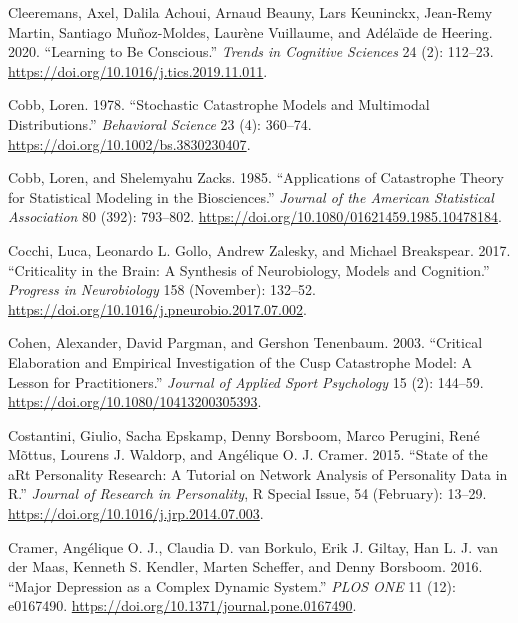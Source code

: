 \documentclass[
  a4paper,
  DIV=11,
  numbers=noendperiod,
  oneside]{scrreprt}
\newlength{\cslhangindent}
\newenvironment{CSLReferences}[2] %
 {\begin{list}{}{%
  \setlength{\itemindent}{0pt}
  \setlength{\leftmargin}{0pt}
  \setlength{\parsep}{0pt}
  \ifodd #1
   \setlength{\leftmargin}{\cslhangindent}
   \setlength{\itemindent}{-1\cslhangindent}
  \fi
  \setlength{\itemsep}{#2\baselineskip}}}
 {\end{list}}
\begin{document}
\begin{CSLReferences}{1}{0}
Cleeremans, Axel, Dalila Achoui, Arnaud Beauny, Lars Keuninckx,
Jean-Remy Martin, Santiago Muñoz-Moldes, Laurène Vuillaume, and Adélaı̈de
de Heering. 2020. {``Learning to Be Conscious.''} \emph{Trends in
Cognitive Sciences} 24 (2): 112--23.
\url{https://doi.org/10.1016/j.tics.2019.11.011}.

Cobb, Loren. 1978. {``Stochastic Catastrophe Models and Multimodal
Distributions.''} \emph{Behavioral Science} 23 (4): 360--74.
\url{https://doi.org/10.1002/bs.3830230407}.

Cobb, Loren, and Shelemyahu Zacks. 1985. {``Applications of {Catastrophe
Theory} for {Statistical Modeling} in the {Biosciences}.''}
\emph{Journal of the American Statistical Association} 80 (392):
793--802. \url{https://doi.org/10.1080/01621459.1985.10478184}.

Cocchi, Luca, Leonardo L. Gollo, Andrew Zalesky, and Michael Breakspear.
2017. {``Criticality in the Brain: {A} Synthesis of Neurobiology, Models
and Cognition.''} \emph{Progress in Neurobiology} 158 (November):
132--52. \url{https://doi.org/10.1016/j.pneurobio.2017.07.002}.

Cohen, Alexander, David Pargman, and Gershon Tenenbaum. 2003.
{``Critical {Elaboration} and {Empirical Investigation} of the {Cusp
Catastrophe Model}: {A Lesson} for {Practitioners}.''} \emph{Journal of
Applied Sport Psychology} 15 (2): 144--59.
\url{https://doi.org/10.1080/10413200305393}.

Costantini, Giulio, Sacha Epskamp, Denny Borsboom, Marco Perugini, René
Mõttus, Lourens J. Waldorp, and Angélique O. J. Cramer. 2015. {``State
of the {aRt} Personality Research: {A} Tutorial on Network Analysis of
Personality Data in {R}.''} \emph{Journal of Research in Personality}, R
{Special Issue}, 54 (February): 13--29.
\url{https://doi.org/10.1016/j.jrp.2014.07.003}.

Cramer, Angélique O. J., Claudia D. van Borkulo, Erik J. Giltay, Han L.
J. van der Maas, Kenneth S. Kendler, Marten Scheffer, and Denny
Borsboom. 2016. {``Major Depression as a Complex Dynamic System.''}
\emph{PLOS ONE} 11 (12): e0167490.
\url{https://doi.org/10.1371/journal.pone.0167490}.


\end{CSLReferences}
\end{document}
